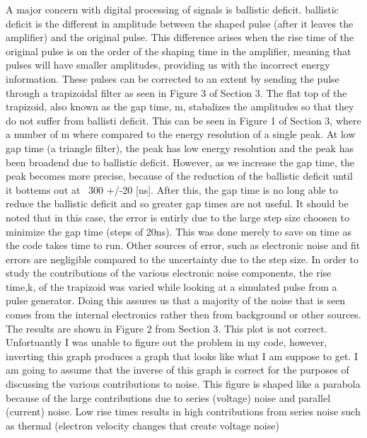 A major concern with digital processing of signals is ballistic deficit. ballistic deficit is the different in amplitude between the shaped pulse (after it leaves the amplifier) 
and the original pulse. This difference arises when the rise time of the original pulse is on the order of the shaping time in the amplifier, meaning that pulses will have smaller amplitudes,
providing us with the incorrect energy information. These pulses can be corrected to an extent by sending the pulse through a trapizoidal filter as seen in Figure 3 of Section 3. 
The flat top of the trapizoid, also known as the gap time, m, stabalizes the amplitudes so that they do not suffer from ballisti deficit. This can be seen in Figure 1 of Section 3, 
where a number of m where compared to the energy resolution of a single peak. At low gap time (a triangle filter), the peak has low energy resolution and the peak has been broadend
due to ballistic deficit. However, as we increase the gap time, the peak becomes more precise, because of the reduction of the ballistic deficit until it bottems out at ~300 +/-20 [ns]. After this,
the gap time is no long able to reduce the ballistic deficit and so greater gap times are not useful. It should be noted that in this case, the error is entirly due to the large step size 
choosen to minimize the gap time (steps of 20ns). This was done merely to save on time as the code takes time to run. Other sources of error, such as electronic noise and fit errors are negligible
compared to the uncertainty due to the step size. 
\linebreak
\linebreak
In order to study the contributions of the various electronic noise components, the rise time,k, of the trapizoid was varied while looking at a simulated pulse from a pulse generator. Doing this
assures us that a majority of the noise that is seen comes from the internal electronics rather then from background or other sources. The results are shown in Figure 2 from Section 3. 
This plot is not correct. Unfortuantly I was unable to figure out the problem in my code, however, inverting this graph produces a graph that looks like what I am suppose to get. I am going
to assume that the inverse of this graph is correct for the purposes of discussing the various contributions to noise. This figure is shaped like a parabola because of the large contributions 
due to series (voltage) noise and parallel (current) noise. Low rise times results in high contributions from series noise such as thermal (electron velocity changes that create voltage noise) 
